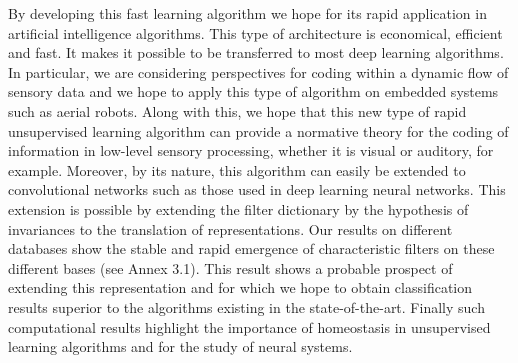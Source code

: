 \documentclass[draft]{article} %
\newcommand{\Acknowledgments}{%
%
This research has received funding from the European Union’s Horizon 2020 research and innovation programme under the Marie Skłodowska-Curie grant agreement No713750. Also, it has been carried out with the financial support of the Regional Council of Provence-Alpes-Côte d’Azur and with the financial support of the A*MIDEX (n° ANR- 11-IDEX-0001-02), funded by the Investissements d'Avenir project funded by the French Government, managed by the French National Research Agency (ANR).
}
\begin{document}
By developing this fast learning algorithm we hope for its rapid application in artificial intelligence algorithms. This type of architecture is economical, efficient and fast. It makes it possible to be transferred to most deep learning algorithms. %
In particular, we are considering perspectives for coding within a dynamic flow of sensory data and we hope to apply this type of algorithm on embedded systems such as aerial robots. Along with this, we hope that this new type of rapid unsupervised learning algorithm can provide a normative theory for the coding of information in low-level sensory processing, whether it is visual or auditory, for example. Moreover, by its nature, this algorithm can easily be extended to convolutional networks such as those used in deep learning neural networks. This extension is possible by extending the filter dictionary by the hypothesis of invariances to the translation of representations. Our results on different databases show the stable and rapid emergence of characteristic filters on these different bases (see Annex 3.1). This result shows a probable prospect of extending this representation and for which we hope to obtain classification results superior to the algorithms existing in the state-of-the-art. Finally such computational results highlight the importance of homeostasis in unsupervised learning algorithms and for the study of neural systems.
\printbibliography
\end{document}
